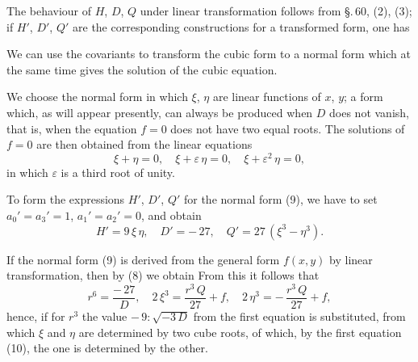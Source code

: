 The behaviour of $H$, $D$, $Q$ under linear transformation follows from \S.\,60, (2), (3); if $H'$, $D'$, $Q'$ are the corresponding constructions for a transformed form, one has

We can use the covariants to transform the cubic form to a normal form which at the same time gives the solution of the cubic equation.

We choose the normal form
in which $\xi$, $\eta$ are linear functions of $x$, $y$; a form which, as will appear presently, can always be produced when $D$ does not vanish, that is, when the equation $f = 0$ does not have two equal roots. The solutions of $f = 0$ are then obtained from the linear equations
\[
\xi + \eta = 0,\quad \xi + \varepsilon\,\eta = 0,\quad \xi + \varepsilon^2\,\eta = 0,
\]
in which $\varepsilon$ is a third root of unity.

To form the expressions $H'$, $D'$, $Q'$ for the normal form (9), we have to set $a_0' = a_3' = 1$, $a_1' = a_2' = 0$, and obtain
\[
H' = 9\,\xi\,\eta,\quad D' = -\,27,\quad Q' = 27\,(\xi^3 - \eta^3).
\]

If the normal form (9) is derived from the general form $f(x,y)$ by linear transformation, then by (8) we obtain
From this it follows that
\[
r^6 = \frac{-\,27}{D},\quad 2\,\xi^3 = \frac{r^3\,Q}{27} + f,\quad 2\,\eta^3 = -\,\frac{r^3\,Q}{27} + f,
\]
hence, if for $r^3$ the value $-\,9 : \sqrt{-3\,D}$ from the first equation is substituted,
from which $\xi$ and $\eta$ are determined by two cube roots, of which, by the first equation (10), the one is determined by the other.
